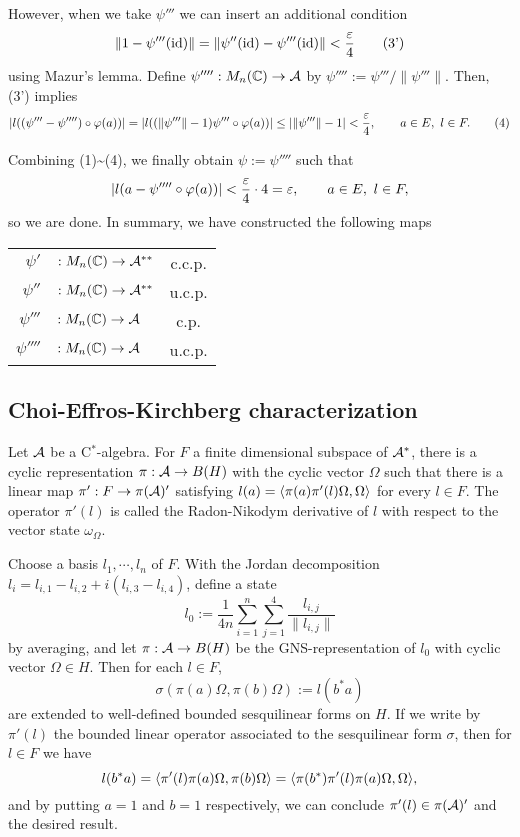 \documentclass{../../small}
\begin{document}
\begin{pf}
However, when we take $\psi'''$ we can insert an additional condition
\[\|1-\psi'''(\operatorname{id})\|=\|\psi''(\operatorname{id})-\psi'''(\operatorname{id})\|<\frac{\varepsilon}4\tag{3'}\]
using Mazur's lemma.
Define $\psi'''':M_n(\mathbb{C})\to\mathcal{A}$ by $\psi'''':=\psi'''/\|\psi'''\|$.
Then, (3') implies
\[|l((\psi'''-\psi'''')\circ\varphi(a))|=|l((\|\psi'''\|-1)\psi'''\circ\varphi(a))|\le|\|\psi'''\|-1|<\frac{\varepsilon}4,\qquad a\in E,\ l\in F.\tag{4}\]

Combining (1)\sim(4), we finally obtain $\psi:=\psi''''$ such that
\[|l(a-\psi''''\circ\varphi(a))|<\frac{\varepsilon}4\cdot4=\varepsilon,\qquad a\in E,\ l\in F,\]
so we are done.
In summary, we have constructed the following maps
\begin{center}
\begin{tabular}{rlc}
$\psi'$&$:M_n(\mathbb{C})\to\mathcal{A}^{**}$ & c.c.p.\\
$\psi''$&$:M_n(\mathbb{C})\to\mathcal{A}^{**}$ & u.c.p.\\
$\psi'''$&$:M_n(\mathbb{C})\to\mathcal{A}$ & c.p.\\
$\psi''''$&$:M_n(\mathbb{C})\to\mathcal{A}$ & u.c.p.
\end{tabular}
\end{center}
\end{pf}


\subsection{Choi-Effros-Kirchberg characterization}


\begin{lem}
Let $\mathcal{A}$ be a C$^*$-algebra.
For $F$ a finite dimensional subspace of $\mathcal{A}^*$, there is a cyclic representation $\pi:\mathcal{A}\to B(H)$ with the cyclic vector $\Omega$ such that there is a linear map $\pi':F\to\pi(\mathcal{A})'$ satisfying $l(a)=\langle\pi(a)\pi'(l)\Omega,\Omega\rangle$ for every $l\in F$.
The operator $\pi'(l)$ is called the Radon-Nikodym derivative of $l$ with respect to the vector state $\omega_\Omega$.
\end{lem}
\begin{pf}
Choose a basis $l_1,\cdots,l_n$ of $F$.
With the Jordan decomposition $l_i=l_{i,1}-l_{i,2}+i(l_{i,3}-l_{i,4})$, define a state
\[l_0:=\frac1{4n}\sum_{i=1}^n\sum_{j=1}^4\frac{l_{i,j}}{\|l_{i,j}\|}\]
by averaging, and let $\pi:\mathcal{A}\to B(H)$ be the GNS-representation of $l_0$ with cyclic vector $\Omega\in H$.
Then for each $l\in F$,
\[\sigma(\pi(a)\Omega,\pi(b)\Omega):=l(b^*a)\]
are extended to well-defined bounded sesquilinear forms on $H$.
If we write by $\pi'(l)$ the bounded linear operator associated to the sesquilinear form $\sigma$, then for $l\in F$ we have
\[l(b^*a)=\langle\pi'(l)\pi(a)\Omega,\pi(b)\Omega\rangle=\langle\pi(b^*)\pi'(l)\pi(a)\Omega,\Omega\rangle,\]
and by putting $a=1$ and $b=1$ respectively, we can conclude $\pi'(l)\in\pi(\mathcal{A})'$ and the desired result.
\end{pf}
\end{document}
